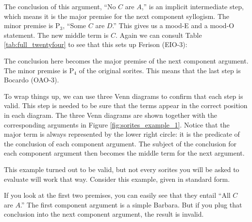 \begin{kormanize}
\end{kormanize}

The conclusion of this argument, ``No $C$ are $A$,'' is an implicit intermediate step, which means it is the major premise for the next component syllogism. The minor premise is P$_3$, ``Some $C$ are $D$.'' This gives us a mood-E and a mood-O statement. The new middle term is $C$. Again we can consult Table \ref{tab:full_twentyfour} to see that this sets up Ferison (EIO-3):

\begin{kormanize}
\end{kormanize}

The conclusion here becomes the major premise of the next component argument. The minor premise is P$_4$ of the original sorites. This means that the last step is Bocardo (OAO-3).

\begin{kormanize}
\end{kormanize}

To wrap things up, we can use three Venn diagrams to confirm that each step is valid. This step is needed to be sure that the terms appear in the correct position in each diagram. The three Venn diagrams are shown together with the corresponding arguments in Figure \ref{fig:sorites_example_1}. Notice that the major term is always represented by the lower right circle: it is the predicate of the conclusion of each component argument. The subject of the conclusion for each component argument then becomes the middle term for the next argument.


This example turned out to be valid, but not every sorites you will be asked to evaluate will work that way. Consider this example, given in standard form.


\begin{kormanize}
 \end{kormanize}

If you look at the first two premises, you can easily see that they entail ``All $C$ are $A$.'' The first component argument is a simple Barbara. But if you plug that conclusion into the next component argument, the result is invalid.


